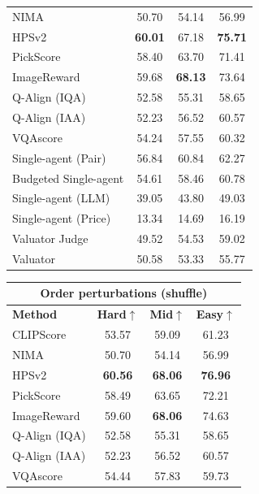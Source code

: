 \begin{table}[t]
\begin{minipage}[t]{0.32\textwidth}
\begin{tabular}{lccc}
NIMA                         & 50.70 & 54.14 & 56.99 \\
HPSv2                        & \textbf{60.01} & 67.18 & \textbf{75.71} \\
PickScore                    & 58.40 & 63.70 & 71.41 \\
ImageReward                  & 59.68 & \textbf{68.13} & 73.64 \\
Q-Align (IQA)                & 52.58 & 55.31 & 58.65 \\
Q-Align (IAA)                & 52.23 & 56.52 & 60.57 \\
VQAscore                     & 54.24 & 57.55 & 60.32 \\
\midrule
Single-agent (Pair)          & 56.84 & 60.84 & 62.27 \\
Budgeted Single-agent        & 54.61 & 58.46 & 60.78 \\
Single-agent (LLM)           & 39.05 & 43.80 & 49.03 \\
Single-agent (Price)         & 13.34 & 14.69 & 16.19 \\
Valuator Judge               & 49.52 & 54.53 & 59.02 \\
Valuator                     & 50.58 & 53.33 & 55.77 \\
\bottomrule
\end{tabular}
\end{minipage}\hfill
\begin{minipage}[t]{0.32\textwidth}
\centering
\begin{tabular}{lccc}
\toprule
\multicolumn{4}{c}{\textbf{Order perturbations (shuffle)}}\\
\midrule
\textbf{Method} & \textbf{Hard}$\uparrow$ & \textbf{Mid}$\uparrow$ & \textbf{Easy}$\uparrow$ \\
\midrule
CLIPScore                    & 53.57 & 59.09 & 61.23 \\
NIMA                         & 50.70 & 54.14 & 56.99 \\
HPSv2                        & \textbf{60.56} & \textbf{68.06} & \textbf{76.96} \\
PickScore                    & 58.49 & 63.65 & 72.21 \\
ImageReward                  & 59.60 & \textbf{68.06} & 74.63 \\
Q-Align (IQA)                & 52.58 & 55.31 & 58.65 \\
Q-Align (IAA)                & 52.23 & 56.52 & 60.57 \\
VQAscore                     & 54.44 & 57.83 & 59.73 \\

\end{tabular}
\end{minipage}
\end{table}
